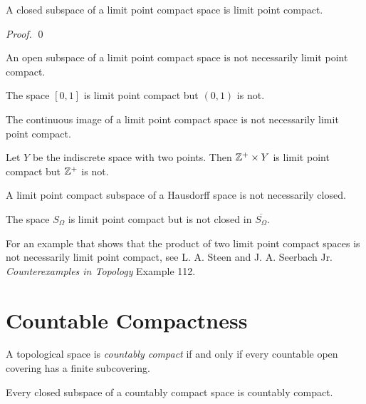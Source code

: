 \begin{proposition}
    A closed subspace of a limit point compact space is limit point compact.
\end{proposition}

\begin{proof}
    \pf
    \qed
\end{proof}

\begin{example}
    An open subspace of a limit point compact space is not necessarily limit point compact.

    The space $[0,1]$ is limit point compact but $(0,1)$ is not.
\end{example}

\begin{example}
    The continuous image of a limit point compact space is not necessarily limit point compact.

    Let $Y$ be the indiscrete space with two points. Then $\mathbb{Z}^+ \times Y$ is limit point compact but $\mathbb{Z}^+$
    is not.
\end{example}

\begin{example}
    A limit point compact subspace of a Hausdorff space is not necessarily closed.

    The space $S_\Omega$ is limit point compact but is not closed in $\overline{S_\Omega}$.
\end{example}

For an example that shows that the product of two limit point compact spaces is not necessarily
limit point compact, see L. A. Steen and J. A. Seerbach Jr. \emph{Counterexamples in
Topology} Example 112.

\section{Countable Compactness}

\begin{definition}
    A topological space is \emph{countably compact} if and only if every
    countable open covering has a finite subcovering.
\end{definition}

\begin{proposition}[AC]
    Every closed subspace of a countably compact space is countably compact.
\end{proposition}

